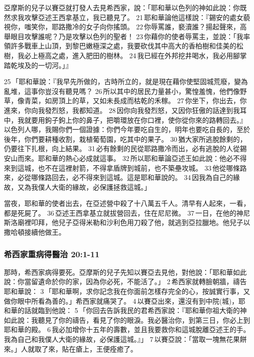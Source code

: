 亞摩斯的兒子以賽亞就打發人去見希西家，說：「耶和華以色列的神如此說：你既然求我攻擊亞述王西拿基立，我已聽見了。 21 耶和華論他這樣說：『錫安的處女藐視你，嗤笑你，耶路撒冷的女子向你搖頭。 22 你辱罵誰，褻瀆誰？揚起聲來，高舉眼目攻擊誰呢？乃是攻擊以色列的聖者！ 23 你藉你的使者辱罵主，並說：「我率領許多戰車上山頂，到黎巴嫩極深之處，我要砍伐其中高大的香柏樹和佳美的松樹，我必上極高之處，進入肥田的樹林。 24 我已經在外邦挖井喝水，我必用腳掌踏乾埃及的一切河。」』

25 「耶和華說：『我早先所做的，古時所立的，就是現在藉你使堅固城荒廢，變為亂堆，這事你豈沒有聽見嗎？ 26 所以其中的居民力量甚小，驚惶羞愧，他們像野草，像青菜，如房頂上的草，又如未長成而枯乾的禾稼。 27 你坐下，你出去，你進來，你向我發烈怒，我都知道。 28 因你向我發烈怒，又因你狂傲的話達到我耳中，我就要用鉤子鉤上你的鼻子，把嚼環放在你口裡，使你從你來的路轉回去。』
以色列人哪，我賜你們一個證據：你們今年要吃自生的，明年也要吃自長的，至於後年，你們要耕種收割，栽植葡萄園，吃其中的果子。 30 猶大家所逃脫餘剩的，仍要往下扎根，向上結果。 31 必有餘剩的民從耶路撒冷而出，必有逃脫的人從錫安山而來。耶和華的熱心必成就這事。 32 所以耶和華論亞述王如此說：他必不得來到這城，也不在這裡射箭，不得拿盾牌到城前，也不築壘攻城。 33 他從哪條路來，必從哪條路回去，必不得來到這城。這是耶和華說的。 34 因我為自己的緣故，又為我僕人大衛的緣故，必保護拯救這城。」

當夜，耶和華的使者出去，在亞述營中殺了十八萬五千人。清早有人起來，一看，都是死屍了。 36 亞述王西拿基立就拔營回去，住在尼尼微。 37 一日，在他的神尼斯洛廟裡叩拜，他兒子亞得米勒和沙利色用刀殺了他，就逃到亞拉臘地。他兒子以撒哈頓接續他做王。

\subsubsection{希西家重病得醫治 20:1-11}
那時，希西家病得要死。亞摩斯的兒子先知以賽亞去見他，對他說：「耶和華如此說：你當留遺命於你的家，因為你必死，不能活了。」 2 希西家就轉臉朝牆，禱告耶和華說： 3 「耶和華啊，求你記念我在你面前怎樣存完全的心，按誠實行事，又做你眼中所看為善的。」希西家就痛哭了。 4 以賽亞出來，還沒有到中院(城)，耶和華的話就臨到他說： 5 「你回去告訴我民的君希西家說：『耶和華你祖大衛的神如此說：我聽見了你的禱告，看見了你的眼淚。我必醫治你，到第三日，你必上到耶和華的殿。 6 我必加增你十五年的壽數，並且我要救你和這城脫離亞述王的手。我為自己和我僕人大衛的緣故，必保護這城。』」 7 以賽亞說：「當取一塊無花果餅來。」人就取了來，貼在瘡上，王便痊癒了。

